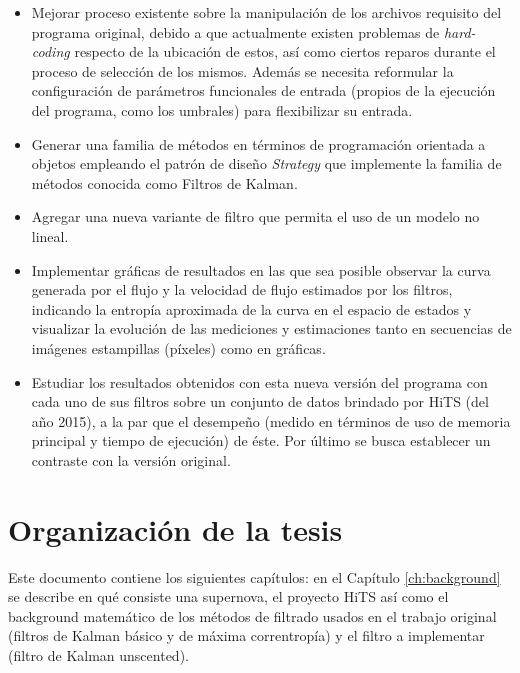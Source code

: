 \begin{itemize}


\item Mejorar proceso existente sobre la manipulaci\'on de los archivos requisito del programa original, debido a que actualmente existen problemas de \textit{hard-coding} respecto de la ubicaci\'on de estos, as\'i como ciertos reparos durante el proceso de selecci\'on de los mismos. Adem\'as se necesita reformular la configuraci\'on de par\'ametros funcionales de entrada (propios de la ejecuci\'on del programa, como los umbrales) para flexibilizar su entrada. 
\bigskip

\item Generar una familia de m\'etodos en t\'erminos de programaci\'on orientada a objetos empleando el patr\'on de dise\~no \textit{Strategy} que implemente la familia de m\'etodos conocida como Filtros de Kalman.
\bigskip

\item Agregar una nueva variante de filtro que permita el uso de un modelo no lineal.
\bigskip

\item Implementar gr\'aficas de resultados en las que sea posible observar la curva generada por el flujo y la velocidad de flujo estimados por los filtros, indicando la entrop\'ia aproximada de la curva en el espacio de estados y visualizar la evoluci\'on de las mediciones y estimaciones tanto en secuencias de im\'agenes estampillas (p\'ixeles) como en gr\'aficas.    
\bigskip

\item Estudiar los resultados obtenidos con esta nueva versi\'on del programa con cada uno de sus filtros sobre un conjunto de datos brindado por HiTS (del a\~no 2015), a la par que el desempe\~no (medido en t\'erminos de uso de memoria principal y tiempo de ejecuci\'on) de \'este. Por \'ultimo se busca establecer un contraste con la versi\'on original.     

\end{itemize}
\section{Organizaci\'on de la tesis}

Este documento contiene los siguientes cap\'itulos: en el Cap\'itulo \ref{ch:background} se describe en qu\'e consiste una supernova, el proyecto HiTS  as\'i como el background matem\'atico de los m\'etodos de filtrado usados en el trabajo original (filtros de Kalman b\'asico y de m\'axima correntrop\'ia) y el filtro a implementar (filtro de Kalman unscented).%
\bigskip

